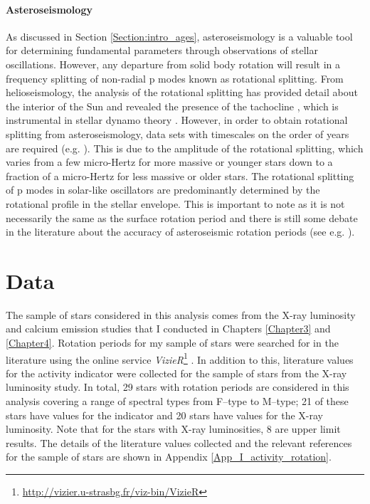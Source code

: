 \paragraph{Asteroseismology}
As discussed in Section \ref{Section:intro_ages}, asteroseismology is a valuable tool for determining fundamental parameters through observations of stellar oscillations. However, any departure from solid body rotation will result in a frequency splitting of non-radial p modes known as rotational splitting. From helioseismology, the analysis of the rotational splitting has provided detail about the interior of the Sun and revealed the presence of the tachocline \citep{Spiegel_Zahn_1992}, which is instrumental in stellar dynamo theory . However, in order to obtain rotational splitting from asteroseismology, data sets with timescales on the order of years are required (e.g. \citealt{Davies_etal_2015}). This is due to the amplitude of the rotational splitting, which varies from a few micro-Hertz for more massive or younger stars down to a fraction of a micro-Hertz for less massive or older stars. The rotational splitting of p modes in solar-like oscillators are predominantly determined by the rotational profile in the stellar envelope. This is important to note as it is not necessarily the same as the surface rotation period and there is still some debate in the literature about the accuracy of asteroseismic rotation periods (see e.g. \citealt{Barnes_etal_2016_aspect_gyro}).

\section{Data}
\label{Chp5_data}

The sample of stars considered in this analysis comes from the X-ray luminosity and calcium emission studies that I conducted in Chapters \ref{Chapter3} and \ref{Chapter4}. Rotation periods for my sample of stars were searched for in the literature using the online service \textit{VizieR}\footnote{\url{http://vizier.u-strasbg.fr/viz-bin/VizieR}} \citep{Ochsenbein_etal_2000}. In addition to this, literature values for the \Rprime activity indicator were collected for the sample of stars from the X-ray luminosity study. In total, 29 stars with rotation periods are considered in this analysis covering a range of spectral types from F--type to M--type; 21 of these stars have values for the \Rprime indicator and 20 stars have values for the X-ray luminosity. Note that for the stars with X-ray luminosities, 8 are upper limit results. The details of the literature values collected and the relevant references for the sample of stars are shown in Appendix \ref{App_I_activity_rotation}.

